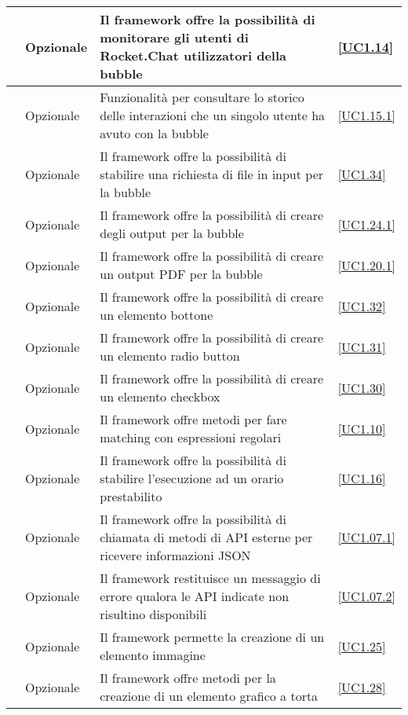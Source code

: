 \begin{longtable}{|P{1.5cm}|P{2.5cm}|P{6.5cm}|P{2.5cm}|}
	\hline \RequisitoOpF\label{L36} & Opzionale & Il framework offre la possibilità di monitorare gli utenti di Rocket.Chat utilizzatori della bubble & \ref{UC1.14} \\
	\hline \RequisitoOpF\label{L37} & Opzionale & Funzionalità per consultare lo storico delle interazioni che un singolo utente ha avuto con la bubble & \ref{UC1.15.1} \\
	\hline \RequisitoOpF\label{L38} & Opzionale & Il framework offre la possibilità di stabilire una richiesta di file in input per la bubble & \ref{UC1.34} \\
	\hline \RequisitoOpF\label{L39} & Opzionale & Il framework offre la possibilità di creare degli output per la bubble & \ref{UC1.24.1} \\
	\hline \RequisitoOpF\label{L40} & Opzionale & Il framework offre la possibilità di creare un output PDF per la bubble & \ref{UC1.20.1} \\	
	\hline \RequisitoOpF\label{L41} & Opzionale & Il framework offre la possibilità di creare un elemento bottone & \ref{UC1.32} \\
 	\hline \RequisitoOpF\label{L84} & Opzionale & Il framework offre la possibilità di creare un elemento radio button & \ref{UC1.31} \\
 	\hline \RequisitoOpF\label{L85} & Opzionale & Il framework offre la possibilità di creare un elemento checkbox & \ref{UC1.30} \\
	\hline \RequisitoOpF\label{L42} & Opzionale & Il framework offre metodi per fare matching con espressioni regolari & \ref{UC1.10} \\
	\hline \RequisitoOpF\label{L43} & Opzionale & Il framework offre la possibilità di stabilire l'esecuzione ad un orario prestabilito & \ref{UC1.16} \\
	\hline \RequisitoOpF\label{L44} & Opzionale & Il framework offre la possibilità di chiamata di metodi di API esterne per ricevere informazioni JSON & \ref{UC1.07.1} \\
	\hline \RequisitoOpF\label{L92} & Opzionale & Il framework restituisce un messaggio di errore qualora le API indicate non risultino disponibili & \ref{UC1.07.2} \\
	\hline \RequisitoOpF\label{L45} & Opzionale & Il framework permette la creazione di un elemento immagine & \ref{UC1.25} \\
	\hline \RequisitoOpF\label{L46} & Opzionale & Il framework offre metodi per la creazione di un elemento grafico a torta  & \ref{UC1.28} \\

\end{longtable}
